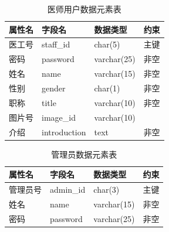 \documentclass{article}
\begin{document}
\begin{table}[H]
    \centering
    \begin{tabularx}{\textwidth}{|>{\raggedright\arraybackslash}X|>{\raggedright\arraybackslash}X|>{\raggedright\arraybackslash}X|>{\raggedright\arraybackslash}X|}
    \toprule
    \textbf{属性名} & \textbf{字段名} & \textbf{数据类型} & \textbf{约束} \\ \midrule
    医工号 & staff\_id & char(5) & 主键 \\ \midrule
    密码 & password & varchar(25) & 非空 \\ \midrule
    姓名 & name & varchar(15) & 非空 \\ \midrule
    性别 & gender & char(1) & 非空 \\ \midrule
    职称 & title & varchar(10) & 非空 \\ \midrule
    图片号 & image\_id & varchar(10) &  \\ \midrule
    介绍 & introduction & text & 非空 \\ \bottomrule
    \end{tabularx}
    \caption{医师用户数据元素表}
    \label{tab:doctor_user_elements}
\end{table}

\begin{table}[H]
    \centering
    \begin{tabularx}{\textwidth}{|>{\raggedright\arraybackslash}X|>{\raggedright\arraybackslash}X|>{\raggedright\arraybackslash}X|>{\raggedright\arraybackslash}X|}
    \toprule
    \textbf{属性名} & \textbf{字段名} & \textbf{数据类型} & \textbf{约束} \\ \midrule
    管理员号 & admin\_id & char(3) & 主键 \\ \midrule
    姓名 & name & varchar(15) & 非空 \\ \midrule
    密码 & password & varchar(25) & 非空 \\ \bottomrule
    \end{tabularx}
    \caption{管理员数据元素表}
    \label{tab:admin_user_elements}
\end{table}
\end{document}
